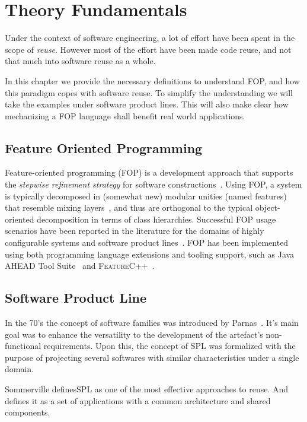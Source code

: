 \chapter{Theory Fundamentals}
Under the context of software engineering, a lot of effort have been spent in the scope of \textit{reuse}.
However most of the effort have been made code reuse, and not that much into software reuse as a whole.

In this chapter we provide the necessary definitions to understand \gls{FOP},
and how this paradigm copes with software reuse.
To simplify the understanding we will take the examples under software product lines.
This will also make clear how mechanizing a \gls{FOP} language shall benefit real world applications.


\section{Feature Oriented Programming}\label{seq:fop}

Feature-oriented programming (FOP) is a development approach 
that supports the \emph{stepwise refinement strategy} for software 
constructions~\cite{batory-tse2004}. Using FOP, a system is 
typically decomposed in (somewhat new) modular unities 
(named features) that resemble mixing layers~\cite{bracha-ecoop1990}, 
and thus are orthogonal to the typical object-oriented 
decomposition in terms of class hierarchies. 
Successful FOP usage scenarios have been reported in the literature 
for the domains of highly configurable systems and
software product lines~\cite{}.
FOP has been implemented using both programming 
language extensions and tooling support, such as 
Java AHEAD Tool Suite~\cite{batory_feature-oriented_2004} and \textsc{FeatureC++}~\cite{apel_featurec++:_2005}. 


\section{Software Product Line}
In the 70's the concept of software families was introduced by Parnas~\cite{parnas1976design}. 
It's main goal was to enhance the versatility to the development of the artefact's 
non-functional requirements. Upon this, the concept of \gls{SPL}
was formalized with the purpose of projecting several softwares
with similar characteristics under a single domain.

Sommerville\cite{Sommerville:2010:SE:1841764} defines\gls{SPL} as one of the most effective approaches to reuse.
And defines it as a set of applications with a common architecture and shared components.

